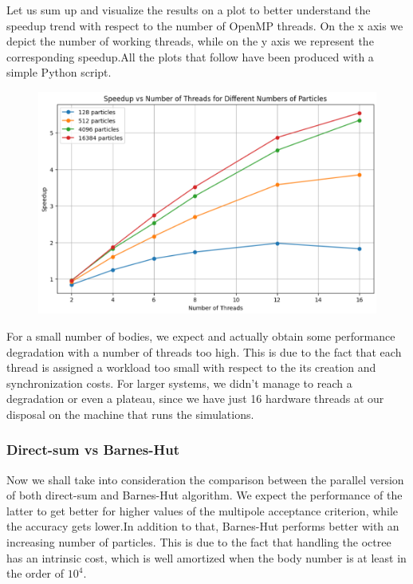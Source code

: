 \documentclass{article}
\begin{document}
Let us sum up and visualize the results on a plot to better understand the speedup trend with respect to the number of OpenMP threads. On the x axis we depict the number of working threads, while on the y axis we represent the corresponding speedup.All the plots that follow have been produced with a simple Python script. 

\begin{figure} [h]
    \centering
    \includegraphics[width=1\textwidth]
    {images/serial_parallel_speedup.png}
    \label{fig:execution_time}
\end{figure}

For a small number of bodies, we expect and actually obtain some performance degradation with a number of threads too high. This is due to the fact that each thread is assigned a workload too small with respect to the its creation and synchronization costs. For larger systems, we didn't manage to reach a degradation or even a plateau, since we have just 16 hardware threads at our disposal on the machine that runs the simulations. 

\subsubsection{Direct-sum vs Barnes-Hut}
Now we shall take into consideration the comparison between the parallel version of both direct-sum and Barnes-Hut algorithm. We expect the performance of the latter to get better for higher values of the multipole acceptance criterion, while the accuracy gets lower.In addition to that, Barnes-Hut performs better with an increasing number of particles. This is due to the fact that handling the octree has an intrinsic cost, which is well amortized when the body number is at least in the order of $10^4$.
\end{document}
